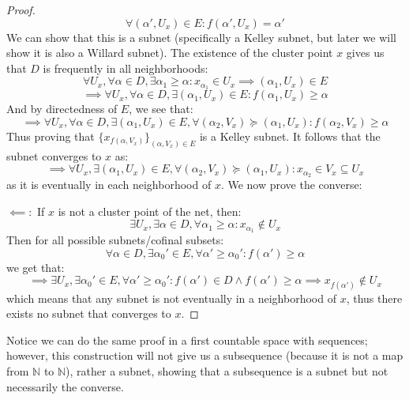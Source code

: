 \documentclass[10pt,letterpaper]{article} %
\begin{document}
\begin{proof}
\begin{equation*}
\forall (\alpha', U_x) \in E: f(\alpha', U_x) = \alpha'
\end{equation*}
We can show that this is a subnet (specifically a Kelley subnet, but later we will show it is also a Willard subnet). The existence of the cluster point $x$ gives us that $D$ is frequently in all neighborhoods:
\begin{equation*}
\forall U_x, \forall \alpha \in D, \exists \alpha_1 \geq \alpha: x_{\alpha_1} \in U_x \implies (\alpha_1, U_x) \in E
\end{equation*} 
\begin{equation*}
\implies \forall U_x, \forall \alpha \in D, \exists (\alpha_1, U_x) \in E: f(\alpha_1, U_x) \geq \alpha
\end{equation*}
And by directedness of $E$, we see that:
\begin{equation*}
\implies \forall U_x, \forall \alpha \in D, \exists (\alpha_1, U_x) \in E, \forall (\alpha_2, V_x) \succcurlyeq (\alpha_1, U_x): f(\alpha_2, V_x) \geq \alpha
\end{equation*}
Thus proving that $\{x_{f(\alpha, V_x)}\}_{(\alpha, V_x) \in E}$ is a Kelley subnet. It follows that the subnet converges to $x$ as:
\begin{equation*}
\implies \forall U_x, \exists (\alpha_1, U_x) \in E, \forall (\alpha_2, V_x) \succcurlyeq (\alpha_1, U_x): x_{\alpha_2} \in V_x \subseteq U_x
\end{equation*}
as it is eventually in each neighborhood of $x$. We now prove the converse:

$\impliedby:$ If $x$ is not a cluster point of the net, then:
\begin{equation*}
\exists U_x, \exists \alpha \in D, \forall \alpha_1 \geq \alpha: x_{\alpha_1} \notin U_x
\end{equation*}
Then for all possible subnets/cofinal subsets:
\begin{equation*}
\forall \alpha \in D, \exists \alpha_0' \in E, \forall \alpha' \geq \alpha_0': f(\alpha') \geq \alpha
\end{equation*}
we get that:
\begin{equation*}
\implies \exists U_x, \exists \alpha_0' \in E, \forall \alpha' \geq \alpha_0': f(\alpha') \in D \land f(\alpha') \geq \alpha \implies x_{f(\alpha')} \notin U_x
\end{equation*}
which means that any subnet is not eventually in a neighborhood of $x$, thus there exists no subnet that converges to $x$.
\end{proof}
Notice we can do the same proof in a first countable space with sequences; however, this construction will not give us a subsequence (because it is not a map from $\mathbb{N}$ to $\mathbb{N}$), rather a subnet, showing that a subsequence is a subnet but not necessarily the converse.\\
\end{document}
